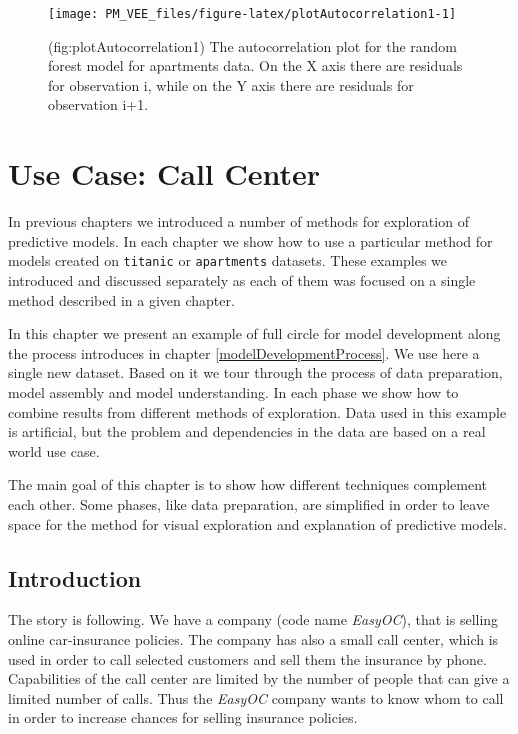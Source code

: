 \documentclass[12pt,]{krantz}
\begin{document}
\begin{figure}

{\centering \texttt{[image: PM\_VEE\_files/figure-latex/plotAutocorrelation1-1]} 

}

\caption{(fig:plotAutocorrelation1) The autocorrelation plot for the random forest model for apartments data. On the X axis there are residuals for observation i, while on the Y axis there are residuals for observation i+1. }\label{fig:plotAutocorrelation1}
\end{figure}

\hypertarget{ccUseCase}{%
\section{Use Case: Call Center}\label{ccUseCase}}

In previous chapters we introduced a number of methods for exploration of predictive models. In each chapter we show how to use a particular method for models created on \texttt{titanic} or \texttt{apartments} datasets. These examples we introduced and discussed separately as each of them was focused on a single method described in a given chapter.

In this chapter we present an example of full circle for model development along the process introduces in chapter \ref{modelDevelopmentProcess}. We use here a single new dataset. Based on it we tour through the process of data preparation, model assembly and model understanding. In each phase we show how to combine results from different methods of exploration.
Data used in this example is artificial, but the problem and dependencies in the data are based on a real world use case.

The main goal of this chapter is to show how different techniques complement each other. Some phases, like data preparation, are simplified in order to leave space for the method for visual exploration and explanation of predictive models.

\hypertarget{introduction-3}{%
\subsection{Introduction}\label{introduction-3}}

The story is following. We have a company (code name \emph{EasyOC}), that is selling online car-insurance policies. The company has also a small call center, which is used in order to call selected customers and sell them the insurance by phone.
Capabilities of the call center are limited by the number of people that can give a limited number of calls. Thus the \emph{EasyOC} company wants to know whom to call in order to increase chances for selling insurance policies.
\end{document}
